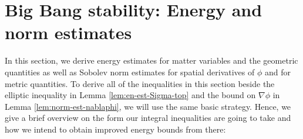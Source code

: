 \documentclass[11pt,leqno,textwidth=10cm]{amsart}
\numberwithin{equation}{section}
\theoremstyle{definition}
\newtheorem{remark}[definition]{Remark}
\theoremstyle{plain}
\newcommand{\1}{\mathbbm{1}}
\newcommand{\todo}[1]{\textcolor{red}{#1}}
\newcommand{\change}[1]{\color{black}#1\color{black}}
\begin{document}

\section{Big Bang stability: Energy and norm estimates}\label{sec:en-est}

In this section, we derive energy estimates for matter variables and the geometric quantities as well as Sobolev norm estimates for spatial derivatives of $\phi$ and for metric quantities. To derive all of the inequalities in this section beside the elliptic inequality in Lemma \ref{lem:en-est-Sigma-top} \change{and the bound on $\nabla\phi$ in Lemma \ref{lem:norm-est-nablaphi}}, we will use the same basic strategy. Hence, we give a brief overview on the form our integral inequalities are going to take and how we intend to obtain \change{improved energy bounds }from there:
\end{document}
